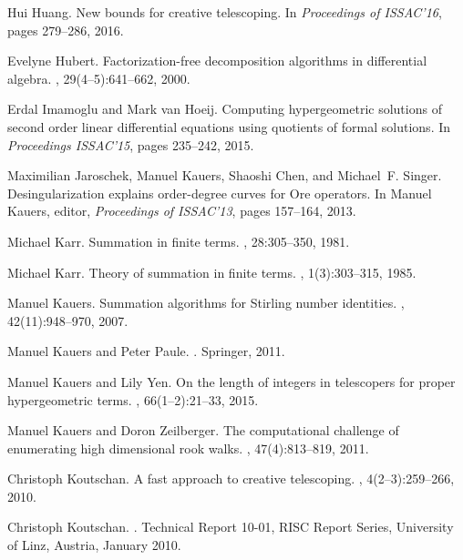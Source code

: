 \documentclass{jssc}
\begin{document}
\begin{thebibliography}{199}
Hui Huang.
\newblock New bounds for creative telescoping.
\newblock In {\em Proceedings of ISSAC'16}, pages 279--286, 2016.

Evelyne Hubert.
\newblock Factorization-free decomposition algorithms in differential algebra.
, 29(4--5):641--662, 2000.

Erdal Imamoglu and Mark van Hoeij.
\newblock Computing hypergeometric solutions of second order linear
  differential equations using quotients of formal solutions.
\newblock In {\em Proceedings ISSAC'15}, pages 235--242, 2015.

Maximilian Jaroschek, Manuel Kauers, Shaoshi Chen, and Michael~F. Singer.
\newblock Desingularization explains order-degree curves for {Ore} operators.
\newblock In Manuel Kauers, editor, {\em Proceedings of ISSAC'13}, pages
  157--164, 2013.

Michael Karr.
\newblock Summation in finite terms.
, 28:305--350, 1981.

Michael Karr.
\newblock Theory of summation in finite terms.
, 1(3):303--315, 1985.

Manuel Kauers.
\newblock Summation algorithms for {S}tirling number identities.
, 42(11):948--970, 2007.

Manuel Kauers and Peter Paule.
.
\newblock Springer, 2011.

Manuel Kauers and Lily Yen.
\newblock On the length of integers in telescopers for proper hypergeometric
  terms.
, 66(1--2):21--33, 2015.

Manuel Kauers and Doron Zeilberger.
\newblock The computational challenge of enumerating high dimensional rook
  walks.
, 47(4):813--819, 2011.

Christoph Koutschan.
\newblock A fast approach to creative telescoping.
, 4(2--3):259--266, 2010.

Christoph Koutschan.
.
\newblock Technical Report 10-01, RISC Report Series, University of Linz,
  Austria, January 2010.


\end{thebibliography}
\end{document}
